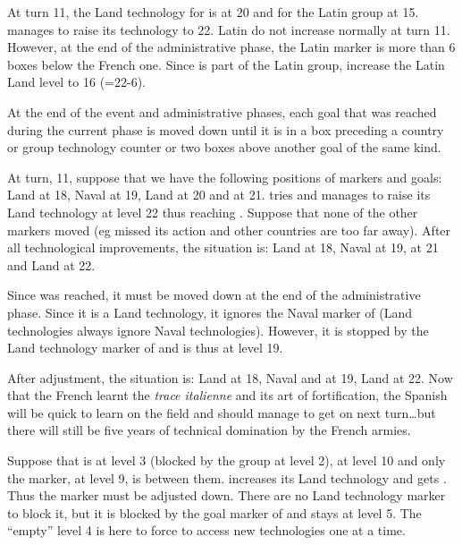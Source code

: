 \begin{exemple}
  At turn 11, the Land technology for \FRA is at 20 and for the Latin group at
  15. \FRA manages to raise its technology to 22. Latin do not increase
  normally at turn 11. However, at the end of the administrative phase, the
  Latin marker is more than 6 boxes below the French one. Since \FRA is part
  of the Latin group, increase the Latin Land level to 16 (=22-6).
\end{exemple}

\label{chExpenses:Technology:Goals Adjustment}
At the end of the event and administrative phases, each goal that was reached
during the current phase is moved down until it is in a box preceding a
country or group technology counter or two boxes above another goal of the
same kind.

\begin{exemple}
  At turn, 11, suppose that we have the following positions of markers and
  goals: Land \SPA at 18, Naval \VEN at 19, Land \FRA at 20 and \TARQ at
  21. \FRA tries and manages to raise its Land technology at level 22 thus
  reaching \TARQ. Suppose that none of the other markers moved (eg \SPA missed
  its action and other countries are too far away). After all technological
  improvements, the situation is: Land \SPA at 18, Naval \VEN at 19, \TARQ at
  21 and Land \FRA at 22.

  Since \TARQ was reached, it must be moved down at the end of the
  administrative phase. Since it is a Land technology, it ignores the Naval
  marker of \VEN (Land technologies always ignore Naval
  technologies). However, it is stopped by the Land technology marker of \SPA
  and is thus at level 19.

  After adjustment, the situation is: Land \SPA at 18, Naval \VEN and \TARQ at
  19, Land \FRA at 22. Now that the French learnt the \emph{trace italienne}
  and its art of fortification, the Spanish will be quick to learn on the
  field and should manage to get \TARQ on next turn\ldots but there will still
  be five years of technical domination by the French armies.
\end{exemple}

\begin{exemple}
  Suppose that \TREN is at level 3 (blocked by the \ROTW group at level 2),
  \TARQ at level 10 and only the \RUS marker, at level 9, is between
  them. \RUS increases its Land technology and gets \TARQ. Thus the marker
  must be adjusted down. There are no Land technology marker to block it, but
  it is blocked by the goal marker of \TREN and stays at level 5. The
  ``empty'' level 4 is here to force \ROTW to access new technologies one at a
  time.
\end{exemple}

